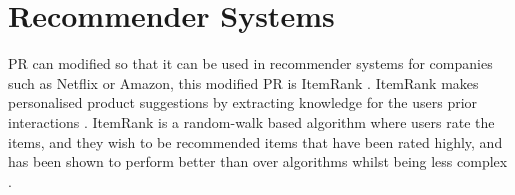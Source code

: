 \section{Recommender Systems} \label{sec:recommender}
PR can modified so that it can be used in recommender systems for companies such as Netflix or Amazon, this modified PR is ItemRank \cite{gleich2015pagerank}. ItemRank makes personalised product suggestions by extracting knowledge for the users prior interactions \cite{gori2007itemrank}. ItemRank is a random-walk based algorithm where users rate the items, and they wish to be recommended items that have been rated highly, and has been shown to perform better than over algorithms whilst being less complex \cite{gori2007itemrank}.
